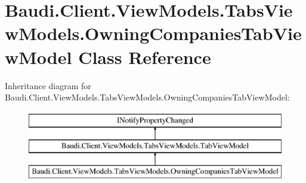 \hypertarget{class_baudi_1_1_client_1_1_view_models_1_1_tabs_view_models_1_1_owning_companies_tab_view_model}{}\section{Baudi.\+Client.\+View\+Models.\+Tabs\+View\+Models.\+Owning\+Companies\+Tab\+View\+Model Class Reference}
\label{class_baudi_1_1_client_1_1_view_models_1_1_tabs_view_models_1_1_owning_companies_tab_view_model}
Inheritance diagram for Baudi.\+Client.\+View\+Models.\+Tabs\+View\+Models.\+Owning\+Companies\+Tab\+View\+Model\+:\begin{figure}[H]
\begin{center}
\leavevmode
\includegraphics[height=3.000000cm]{class_baudi_1_1_client_1_1_view_models_1_1_tabs_view_models_1_1_owning_companies_tab_view_model}
\end{center}
\end{figure}
